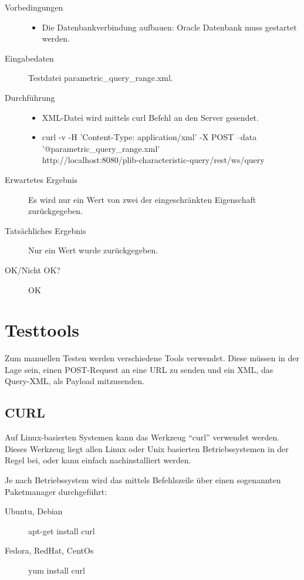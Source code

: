 \begin{description}
\item[Vorbedingungen] 
  \begin{itemize}
   \item Die Datenbankverbindung aufbauen: Oracle Datenbank muss gestartet werden.
  \end{itemize}
\item[Eingabedaten] Testdatei parametric\_query\_range.xml. 
\item[Durchführung]
   \begin{itemize}
   \item XML-Datei wird mittels curl Befehl an den Server gesendet.
   \item curl -v -H 'Content-Type: application/xml' -X POST --data \\
   '@parametric\_query\_range.xml' \\
   http://localhost:8080/plib-characteristic-query/rest/ws/query
  \end{itemize}
\item[Erwartetes Ergebnis] Es wird nur ein Wert von zwei der eingeschränkten Eigenschaft zurückgegeben.  
\item[Tatsächliches Ergebnis] Nur ein Wert wurde zurückgegeben. 
\item[OK/Nicht OK?] OK
\end{description}

\section{Testtools}\label{anh:testtools}

Zum manuellen Testen werden verschiedene Tools verwendet. Diese müssen in der Lage sein, einen POST-Request an eine URL zu senden und ein XML, das Query-XML, als Payload mitzusenden.

\subsection{CURL}

Auf Linux-basierten Systemen kann das Werkzeug \enquote{curl} verwendet werden. Dieses Werkzeug liegt allen Linux oder Unix basierten Betriebssystemen in der Regel bei, oder kann einfach nachinstalliert werden. 

Je nach Betriebssystem wird das mittels Befehlszeile über einen sogenannten Paketmanager durchgeführt:
\begin{description}
\item[Ubuntu, Debian] apt-get install curl
\item[Fedora, RedHat, CentOs] yum install curl
\end{description}

